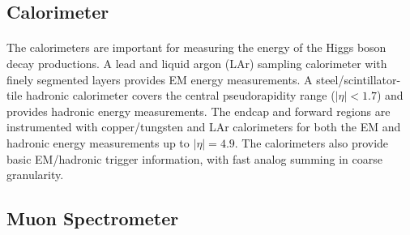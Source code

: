 \subsection{Calorimeter}
\paragraph{}
The calorimeters are important for measuring the energy of the Higgs boson decay productions.
A lead and liquid argon (LAr) sampling calorimeter with finely segmented layers provides EM energy measurements.
A steel/scintillator-tile hadronic calorimeter covers the central pseudorapidity range ($|\eta| < 1.7$) and provides hadronic energy measurements.
The endcap and forward regions are instrumented with copper/tungsten and LAr calorimeters for both the EM and hadronic energy measurements up to $|\eta| = 4.9$. 
The calorimeters also provide basic EM/hadronic trigger information, with fast analog summing in coarse granularity.



\subsection{Muon Spectrometer}

